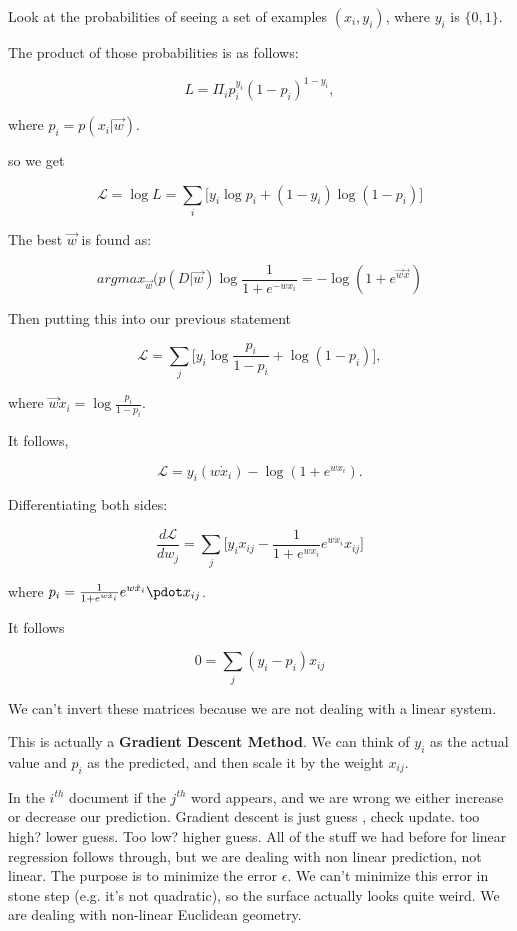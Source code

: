 Look at the probabilities of seeing a set of examples $(x_i, y_i)$, where $y_i$ is $\{0, 1\}$.

The product of those probabilities is as follows:

$$L = \Pi_i p^{y_i}_i ( 1 - p_i)^{1 - y_i},$$

where $p_i = p(x_i | \vec{w})$.

so we get

$$\mathcal{L} = \log L = \sum_i \Bigg[ y_i \log p_i + \left(1 - y_i \right)\log(1 - p_i)\Bigg]$$

The best $\vec{w}$ is found as:

$$argmax_{\vec{w}} (p(D | \vec{w}) \log\frac{1}{1 + e^{-w x_i} } = -\log(1 + e^{\vec{w} \dot \vec{x}})$$

Then putting this into our previous statement

$$\mathcal{L} = \sum_j \Bigg[ y_i \log\frac{p_i}{1 - p_i} + \log(1 - p_i)\Bigg],$$

where $\vec{w} \dot x_i = \log\frac{p_i}{1 - p_i}$.

It follows, 

$$\mathcal{L} = y_i ( w \dot x_i ) - \log(1 + e^{w x_i }).$$

Differentiating both sides:

$$\frac{d \mathcal{L}}{d w_j} = \sum_j \Bigg[ y_i x_{ij} - \frac{1}{1 + e^{w  x_i}} e^{w \dot x_i} x_{ij} \Bigg]$$

where $p_i = \frac{1}{1 + e^{w \dot x_i}} e^{w \dot x_i} \pdot x_{ij}$. 

It follows

$$0 = \sum_j (y_i - p_i) x_{ij}$$

We can't invert these matrices because we are not dealing with a linear system. 

This is actually a \textbf{Gradient Descent Method}. We can think of $y_i$ as the actual value and $p_i$ as the predicted, and then scale it by the weight $x_{ij}$.

In the $i^{th}$ document if the $j^{th}$ word appears, and we are wrong we either increase or decrease our prediction. Gradient descent is just guess , check update. too high? lower guess. Too low? higher guess. All of the stuff we had before for linear regression follows through, but we are dealing with non linear prediction, not linear. The purpose is to minimize the error $\epsilon$. We can't minimize this error in stone step (e.g. it's not quadratic), so the surface actually looks quite weird. We are dealing with non-linear Euclidean geometry. 


